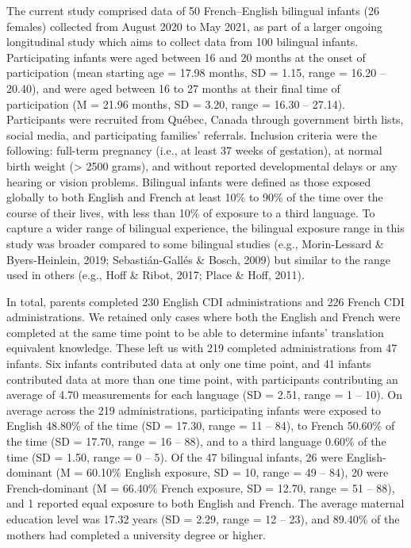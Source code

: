 \documentclass[
  english,
  ,man,floatsintext]{apa6}
\begin{document}
The current study comprised data of 50 French--English bilingual infants (26 females) collected from August 2020 to May 2021, as part of a larger ongoing longitudinal study which aims to collect data from 100 bilingual infants. Participating infants were aged between 16 and 20 months at the onset of participation (mean starting age = 17.98 months, SD = 1.15, range = 16.20 -- 20.40), and were aged between 16 to 27 months at their final time of participation (M = 21.96 months, SD = 3.20, range = 16.30 -- 27.14). Participants were recruited from Québec, Canada through government birth lists, social media, and participating families' referrals. Inclusion criteria were the following: full-term pregnancy (i.e., at least 37 weeks of gestation), at normal birth weight (\textgreater{} 2500 grams), and without reported developmental delays or any hearing or vision problems. Bilingual infants were defined as those exposed globally to both English and French at least 10\% to 90\% of the time over the course of their lives, with less than 10\% of exposure to a third language. To capture a wider range of bilingual experience, the bilingual exposure range in this study was broader compared to some bilingual studies (e.g., Morin-Lessard \& Byers-Heinlein, 2019; Sebastián-Gallés \& Bosch, 2009) but similar to the range used in others (e.g., Hoff \& Ribot, 2017; Place \& Hoff, 2011).

In total, parents completed 230 English CDI administrations and 226 French CDI administrations. We retained only cases where both the English and French were completed at the same time point to be able to determine infants' translation equivalent knowledge. These left us with 219 completed administrations from 47 infants. Six infants contributed data at only one time point, and 41 infants contributed data at more than one time point, with participants contributing an average of 4.70 measurements for each language (SD = 2.51, range = 1 -- 10). On average across the 219 administrations, participating infants were exposed to English 48.80\% of the time (SD = 17.30, range = 11 -- 84), to French 50.60\% of the time (SD = 17.70, range = 16 -- 88), and to a third language 0.60\% of the time (SD = 1.50, range = 0 -- 5). Of the 47 bilingual infants, 26 were English-dominant (M = 60.10\% English exposure, SD = 10, range = 49 -- 84), 20 were French-dominant (M = 66.40\% French exposure, SD = 12.70, range = 51 -- 88), and 1 reported equal exposure to both English and French. The average maternal education level was 17.32 years (SD = 2.29, range = 12 -- 23), and 89.40\% of the mothers had completed a university degree or higher.
\end{document}
